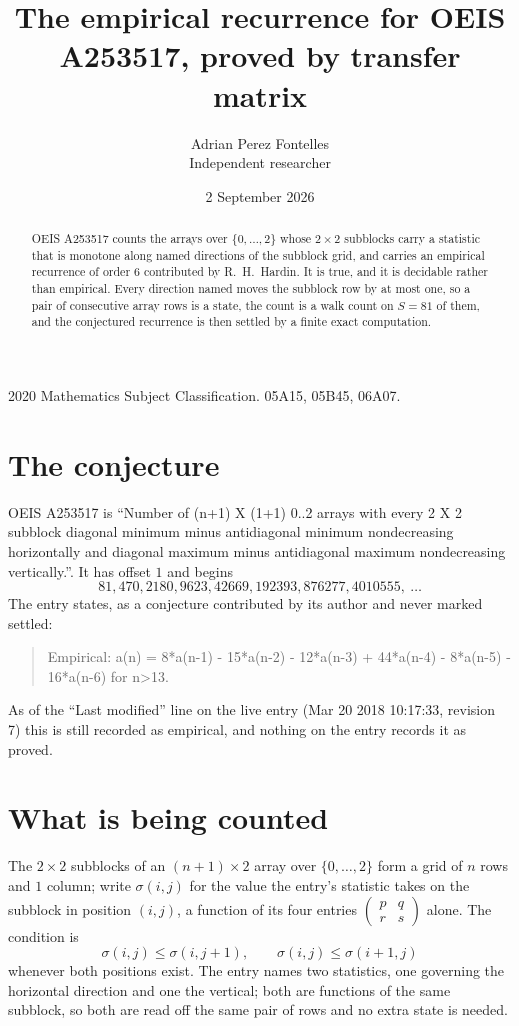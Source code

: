 \documentclass[11pt,a4paper]{article}
\title{The empirical recurrence for OEIS A253517, proved by transfer matrix}
\author{Adrian Perez Fontelles\\ \small Independent researcher}
\date{2 September 2026}
\theoremstyle{plain}
\theoremstyle{definition}
\begin{document}
\maketitle

\begin{abstract}
OEIS A253517 counts the arrays over $\{0,\dots,2\}$ whose $2\times2$ subblocks carry a
statistic that is monotone along named directions of the subblock grid, and carries an
empirical recurrence of order $6$ contributed by R.~H.~Hardin. It is true, and it is
decidable rather than empirical. Every direction named moves the subblock row by at most one,
so a pair of consecutive array rows is a state, the count is a walk count on $S=81$ of them,
and the conjectured recurrence is then settled by a finite exact computation.
\end{abstract}

\noindent\small 2020 Mathematics Subject Classification. 05A15, 05B45, 06A07.\normalsize

\section{The conjecture}

OEIS A253517 is ``Number of (n+1) X (1+1) 0..2 arrays with every 2 X 2 subblock diagonal minimum minus antidiagonal minimum nondecreasing horizontally and diagonal maximum minus antidiagonal maximum nondecreasing vertically.''. It has offset $1$ and begins
\[
81, 470, 2180, 9623, 42669, 192393, 876277, 4010555,\ \dots
\]
The entry states, as a conjecture contributed by its author and never marked settled:
\begin{quote}
Empirical: a(n) = 8*a(n-1) - 15*a(n-2) - 12*a(n-3) + 44*a(n-4) - 8*a(n-5) - 16*a(n-6) for n>13.
\end{quote}
As of the ``Last modified'' line on the live entry (Mar 20 2018 10:17:33, revision 7) this is still
recorded as empirical, and nothing on the entry records it as proved.

\section{What is being counted}

The $2\times2$ subblocks of an $(n+1)\times2$ array over $\{0,\dots,2\}$ form a grid
of $n$ rows and $1$ column; write $\sigma(i,j)$ for the value the entry's statistic takes on
the subblock in position $(i,j)$, a function of its four entries
$\begin{pmatrix}p&q\\r&s\end{pmatrix}$ alone. The condition is
\[
\sigma(i,j)\le\sigma(i,j+1),\qquad \sigma(i,j)\le\sigma(i+1,j)
\]
whenever both positions exist. The entry names two statistics, one governing the horizontal direction and one the vertical; both are functions of the same subblock, so both are read off the same pair of rows and no extra state is needed.
\end{document}
